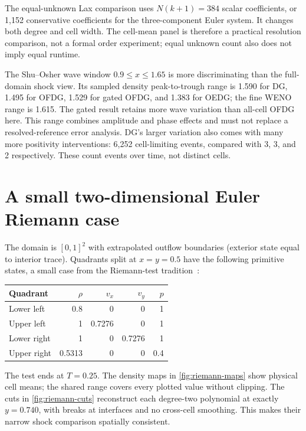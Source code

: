 The equal-unknown Lax comparison uses $N(k+1)=384$ scalar coefficients, or
1,152 conservative coefficients for the three-component Euler system. It changes
both degree and cell width. The cell-mean panel is therefore a practical
resolution comparison, not a formal order experiment; equal unknown count also
does not imply equal runtime.


The Shu--Osher wave window $0.9\leq x\leq1.65$ is more discriminating than the
full-domain shock view. Its sampled density peak-to-trough range is 1.590 for
DG, 1.495 for OFDG, 1.529 for gated OFDG, and 1.383 for OEDG; the fine WENO
range is 1.615. The gated result retains more wave variation than all-cell
OFDG here. This range combines amplitude and phase effects and must not replace
a resolved-reference error analysis. DG's larger variation also comes with
many more positivity interventions: 6,252 cell-limiting events, compared with
3, 3, and 2 respectively. These count events over time, not distinct cells.

\clearpage

\section{A small two-dimensional Euler Riemann case}
The domain is $[0,1]^2$ with extrapolated outflow boundaries (exterior state equal to interior trace). Quadrants split
at $x=y=0.5$ have the following primitive states, a small case from the
Riemann-test tradition~\cite{LaxLiu1998}:
\begin{center}\small
\begin{tabular}{lrrrr}\toprule
Quadrant & $\rho$ & $v_x$ & $v_y$ & $p$\\\midrule
Lower left & 0.8 & 0 & 0 & 1\\
Upper left & 1 & 0.7276 & 0 & 1\\
Lower right & 1 & 0 & 0.7276 & 1\\
Upper right & 0.5313 & 0 & 0 & 0.4\\\bottomrule
\end{tabular}\end{center}
The test ends at $T=0.25$. The density maps in \cref{fig:riemann-maps} show
physical cell means; the shared range covers every plotted value without
clipping. The cuts in \cref{fig:riemann-cuts} reconstruct each degree-two
polynomial at exactly $y=0.740$, with breaks at interfaces and no cross-cell
smoothing. This makes their narrow shock comparison spatially consistent.

